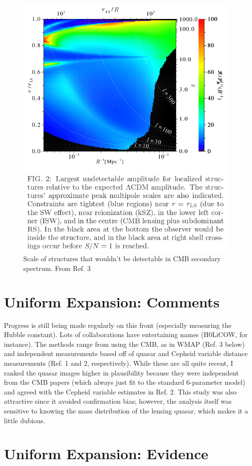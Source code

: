 \documentclass{article}
\begin{document}
\begin{figure}[h]
\begin{center}
\includegraphics[width=.7\textwidth,angle=0.]{homogeneity.png}
\end{center}
\caption{Scale of structures that wouldn't be detectable in CMB secondary spectrum. From Ref. 3}
\end{figure}



\newpage
\section{Uniform Expansion: Comments}
Progress is still being made regularly on this front (especially measuring the Hubble constant). Lots of collaborations have entertaining names (H0LiCOW, for instance). The methods range from using the CMB, as in WMAP (Ref. 3 below) and independent measurements based off of quasar and Cepheid variable distance measurements (Ref. 1 and 2, respectively). While these are all quite recent, I ranked the quasar images higher in plausibility because they were independent from the CMB papers (which always just fit to the standard 6-parameter model) and agreed with the Cepheid variable estimates in Ref. 2. This study was also attractive since it avoided confirmation bias; however, the analysis itself was sensitive to knowing the mass distribution of the lensing quasar, which makes it a little dubious. 

 
\newpage
\section*{Uniform Expansion: Evidence}
\end{document}
